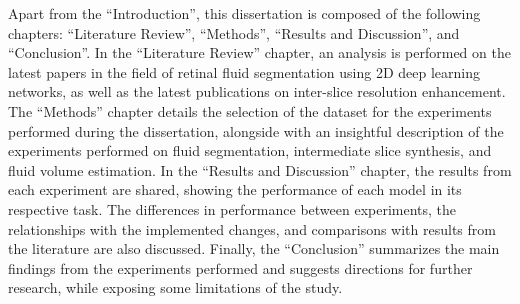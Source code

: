Apart from the ``Introduction'', this dissertation is composed of the following chapters: ``Literature Review'', ``Methods'', ``Results and Discussion'', and ``Conclusion''. In the ``Literature Review'' chapter, an analysis is performed on the latest papers in the field of retinal fluid segmentation using 2D deep learning networks, as well as the latest publications on inter-slice resolution enhancement. The ``Methods'' chapter details the selection of the dataset for the experiments performed during the dissertation, alongside with an insightful description of the experiments performed on fluid segmentation, intermediate slice synthesis, and fluid volume estimation. In the ``Results and Discussion'' chapter, the results from each experiment are shared, showing the performance of each model in its respective task. The differences in performance between experiments, the relationships with the implemented changes, and comparisons with results from the literature are also discussed. Finally, the ``Conclusion'' summarizes the main findings from the experiments performed and suggests directions for further research, while exposing some limitations of the study.
